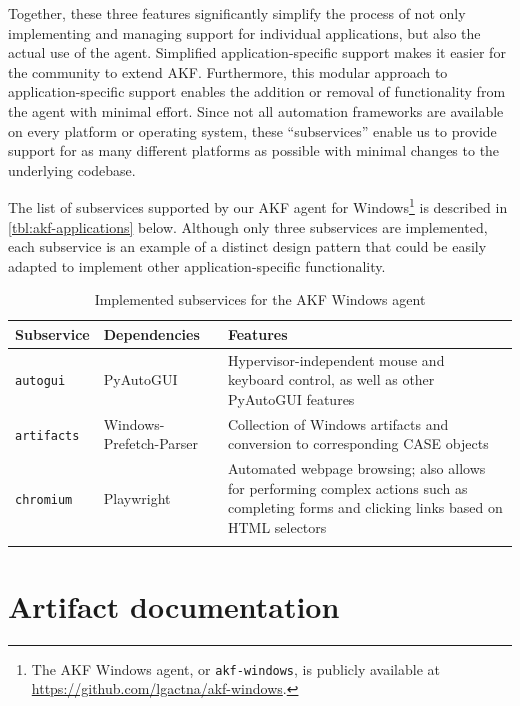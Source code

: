 \documentclass[final,5p,times,twocolumn]{elsarticle}
\newcommand{\passthrough}[1]{#1}
\begin{document}
Together, these three features significantly simplify the process of not
only implementing and managing support for individual applications, but
also the actual use of the agent. Simplified application-specific
support makes it easier for the community to extend AKF. Furthermore,
this modular approach to application-specific support enables the
addition or removal of functionality from the agent with minimal effort.
Since not all automation frameworks are available on every platform or
operating system, these ``subservices'' enable us to provide support for
as many different platforms as possible with minimal changes to the
underlying codebase.

The list of subservices supported by our AKF agent for
Windows\footnote{The AKF Windows agent, or
  \passthrough{\lstinline!akf-windows!}, is publicly available at
  \url{https://github.com/lgactna/akf-windows}.} is described in
\autoref{tbl:akf-applications} below. Although only three subservices
are implemented, each subservice is an example of a distinct design
pattern that could be easily adapted to implement other
application-specific functionality.


\begin{table}[tb]
\footnotesize
\centering
\begin{tabularx}{\linewidth}{L{0.2} L{0.2} L{0.6}}
\toprule
  \textbf{Subservice} & \textbf{Dependencies} & \textbf{Features} \\
\midrule
  \passthrough{\lstinline!autogui!} & PyAutoGUI
  \citep{sweigartAsweigartPyautogui2025a} & Hypervisor-independent
  mouse and keyboard control, as well as other PyAutoGUI features \\
  \passthrough{\lstinline!artifacts!} & Windows-Prefetch-Parser
  \citep{wittPoorBillionaireWindowsPrefetchParser2025} & Collection of
  Windows artifacts and conversion to corresponding CASE objects \\
  \passthrough{\lstinline!chromium!} & Playwright
  \citep{MicrosoftPlaywrightpython2025} & Automated webpage browsing;
  also allows for performing complex actions such as completing forms and
  clicking links based on HTML selectors \\ \\
\bottomrule
\end{tabularx}
\caption{Implemented subservices for the AKF Windows agent}\label{tbl:akf-applications}
\end{table}


\section{Artifact documentation}\label{artifact-documentation}
\end{document}
